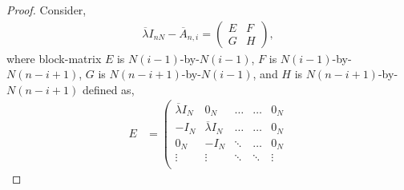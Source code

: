 \documentclass[journal]{IEEEtran}
\begin{document}
\begin{proof}
Consider,
\begin{align}
 		 \overline{\lambda} I_{nN} - \overline{A}_{n,i}= 
		 \left(\begin{array}{cc}
			E  & F\\
			G & H
		\end{array}\right),	
\end{align}
where block-matrix $E$ is $N(i-1)$-by-$N(i-1)$,  $F$ is $N(i-1)$-by-$N(n-i+1)$,  $G$ is $N(n-i+1)$-by-$N(i-1)$, and $H$ is $N(n-i+1)$-by-$N(n-i+1)$ defined as,	
\footnotesize
\begin{align}  
		 E &= \left( 
		\begin{array}{ccccc}
			\overline{\lambda} I_N & 0_N & \hdots & \hdots &  0_N \\
			-I_N &  \overline{\lambda} I_N  & \hdots &\hdots & 0_N\\
			0_N &  -I_N & \ddots   &  \hdots   & 0_N  \\
			\vdots & \vdots & \ddots &  \ddots & \vdots \\

\end{array}
\end{align}
\end{proof}
\end{document}
